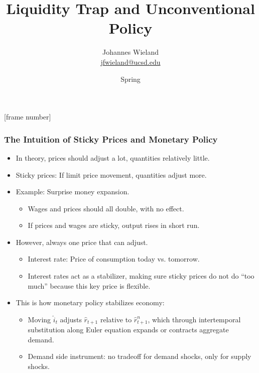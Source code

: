 \documentclass[english,xcolor=svgnames]{beamer}
\begin{document}
\title{Liquidity Trap and Unconventional Policy}
\vspace{1cm}
\author[shortname]{
\begin{tabular}{c}
	Johannes Wieland \\ 
	\footnotesize \href{mailto:jfwieland@ucsd.edu}{jfwieland@ucsd.edu}  \\ 
\end{tabular}
}

\date{Spring \the\year}

\makebeamertitle
{}[frame number]{}

\addtocounter{framenumber}{-1}


\begin{frame}
\frametitle{The Intuition of Sticky Prices and Monetary Policy}
\begin{itemize}
	\item In theory, prices should adjust a lot, quantities relatively little.
	\item Sticky prices: If limit price movement, quantities adjust more.
	\item Example: Surprise money expansion.
	\begin{itemize}
		\item Wages and prices should all double, with no effect.
		\item If prices and wages are sticky, output rises in short run.
	\end{itemize}
	\item However, always one price that can adjust.
	\begin{itemize}
		\item Interest rate: Price of consumption today vs. tomorrow.
		\item Interest rates act as a stabilizer, making sure sticky prices do not do ``too much'' because this key price is flexible.
	\end{itemize}
	\item This is how monetary policy stabilizes economy:
	\begin{itemize}
		\item Moving $\hat{i}_t$ adjusts $\hat{r}_{t+1}$ relative to $\hat{r}^n_{t+1}$, which through intertemporal substitution along Euler equation expands or contracts aggregate demand.
		\item Demand side instrument: no tradeoff for demand shocks, only for supply shocks.
	\end{itemize}
\end{itemize}
\end{frame}
\end{document}
